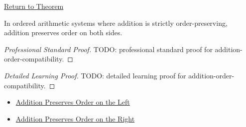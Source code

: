 \newpage
{}
\label{prf:addition-order-compatibility}

\begin{remark*}[Return]
\hyperref[prop:addition-order-compatibility]{Return to Theorem}
\end{remark*}

\begin{proposition*}
In ordered arithmetic systems where addition is strictly order-preserving,
addition preserves order on both sides.
\end{proposition*}

\begin{proof}[Professional Standard Proof]
\LRAProofBodyStart
TODO: professional standard proof for addition-order-compatibility.
\end{proof}

\begin{proof}[Detailed Learning Proof]
\LRAProofBodyStart
TODO: detailed learning proof for addition-order-compatibility.
\end{proof}

\begin{remark*}
\end{remark*}

\begin{dependencies}
\begin{itemize}
  \item \hyperref[prop:addition-order-compatibility-left]{Addition Preserves Order on the Left}
  \item \hyperref[prop:addition-order-compatibility-right]{Addition Preserves Order on the Right}
\end{itemize}
\end{dependencies}

\clearpage
